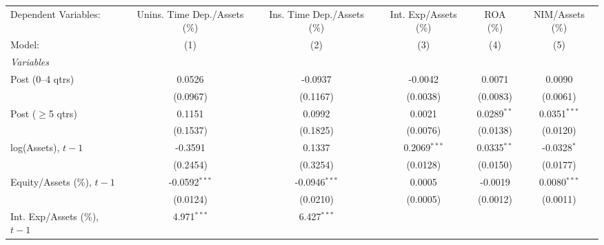 
\begingroup
\centering
\begin{tabular}{lccccc}
   \tabularnewline \midrule \midrule
   Dependent Variables:                                                   & Unins. Time Dep./Assets (\%)  & Ins. Time Dep./Assets (\%)  & Int. Exp/Assets (\%)  & ROA (\%)       & NIM/Assets (\%)\\   
   Model:                                                                 & (1)                           & (2)                         & (3)                   & (4)            & (5)\\  
   \midrule
   \emph{Variables}\\
   Post (0--4 qtrs)                                                       & 0.0526                        & -0.0937                     & -0.0042               & 0.0071         & 0.0090\\   
                                                                          & (0.0967)                      & (0.1167)                    & (0.0038)              & (0.0083)       & (0.0061)\\   
   Post ($\geq$5 qtrs)                                                    & 0.1151                        & 0.0992                      & 0.0021                & 0.0289$^{**}$  & 0.0351$^{***}$\\   
                                                                          & (0.1537)                      & (0.1825)                    & (0.0076)              & (0.0138)       & (0.0120)\\   
   log(Assets), $t{-}1$                                                   & -0.3591                       & 0.1337                      & 0.2069$^{***}$        & 0.0335$^{**}$  & -0.0328$^{*}$\\   
                                                                          & (0.2454)                      & (0.3254)                    & (0.0128)              & (0.0150)       & (0.0177)\\   
   Equity/Assets (\%), $t{-}1$                                            & -0.0592$^{***}$               & -0.0946$^{***}$             & 0.0005                & -0.0019        & 0.0080$^{***}$\\   
                                                                          & (0.0124)                      & (0.0210)                    & (0.0005)              & (0.0012)       & (0.0011)\\   
   Int. Exp/Assets (\%), $t{-}1$                                          & 4.971$^{***}$                 & 6.427$^{***}$               &                       &                &   \\   

\end{tabular}
